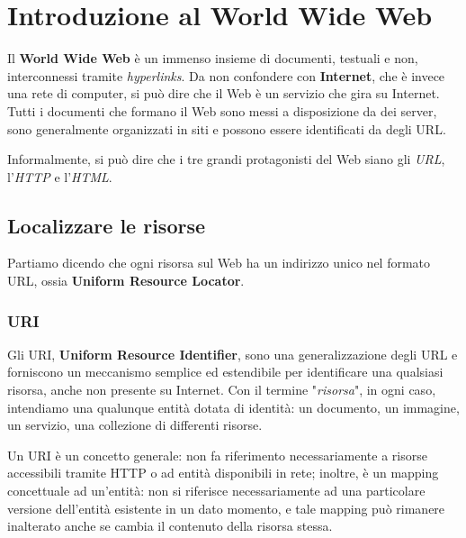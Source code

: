 \section{Introduzione al World Wide Web}

Il \textbf{World Wide Web} è un immenso insieme di documenti, testuali e non, interconnessi tramite \textit{hyperlinks}. Da non confondere con \textbf{Internet}, che è invece una rete di computer, si può dire che il Web è un servizio che gira su Internet. Tutti i documenti che formano il Web sono messi a disposizione da dei server, sono generalmente organizzati in siti e possono essere identificati da degli URL.

\vspace{3mm}

Informalmente, si può dire che i tre grandi protagonisti del Web siano gli \textit{URL}, l'\textit{HTTP} e l'\textit{HTML}.


\subsection{Localizzare le risorse}

Partiamo dicendo che ogni risorsa sul Web ha un indirizzo unico nel formato URL, ossia \textbf{Uniform Resource Locator}.

\subsubsection{URI}

Gli URI, \textbf{Uniform Resource Identifier}, sono una generalizzazione degli URL e forniscono un meccanismo semplice ed estendibile per identificare una qualsiasi risorsa, anche non presente su Internet. Con il termine "\textit{risorsa}", in ogni caso, intendiamo una qualunque entità dotata di identità: un documento, un immagine, un servizio, una collezione di differenti risorse.

\vspace{3mm}

Un URI è un concetto generale: non fa riferimento necessariamente a risorse accessibili tramite HTTP o ad entità disponibili in rete; inoltre, è un mapping concettuale ad un'entità: non si riferisce necessariamente ad una particolare versione dell'entità esistente in un dato momento, e tale mapping può rimanere inalterato anche se cambia il contenuto della risorsa stessa. 

\vspace{3mm}

